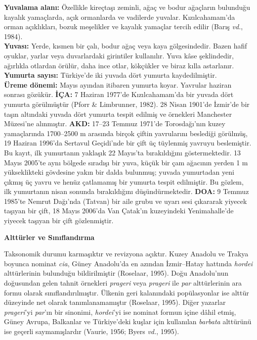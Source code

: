 \documentclass[
  10.5pt,
  a4paper,
  DIV=11,
  numbers=noendperiod,
  twocolumn]{scrreprt}
\begin{document}
\textbf{Yuvalama alanı:} Özellikle kireçtaşı zeminli, ağaç ve bodur
ağaçların bulunduğu kayalık yamaçlarda, açık ormanlarda ve vadilerde
yuvalar. Kızılcahamam'da orman açıklıkları, bozuk meşelikler ve kayalık
yamaçlar tercih edilir (Barış \emph{vd.}, 1984).\\
\textbf{Yuvası:} Yerde, kısmen bir çalı, bodur ağaç veya kaya
gölgesindedir. Bazen hafif oyuklar, yarlar veya duvarlardaki girintiler
kullanılır. Yuva kâse şeklindedir, ağırlıkla otlardan örülür, daha ince
otlar, kökçükler ve biraz kılla astarlanır.\\
\textbf{Yumurta sayısı:} Türkiye'de iki yuvada dört yumurta
kaydedilmiştir.\\
\textbf{Üreme dönemi:} Mayıs ayından itibaren yumurta koyar. Yavrular
haziran sonrası gözükür. \textbf{İÇA:} 7 Haziran 1977'de Kızılcahamam'da
bir yuvada dört yumurta görülmüştür (Pforr \& Limbrunner, 1982). 28
Nisan 1901'de İzmir'de bir taşın altındaki yuvada dört yumurta tespit
edilmiş ve örnekleri Manchester Müzesi'ne alınmıştır. \textbf{AKD:}
17--23 Temmuz 1971'de Torosdağı'nın kuzey yamaçlarında 1700--2500 m
arasında birçok çiftin yavrularını beslediği görülmüş, 19 Haziran
1996'da Sertavul Geçidi'nde bir çift üç tüylenmiş yavruyu beslemiştir.
Bu kayıt, ilk yumurtanın yaklaşık 22 Mayıs'ta bırakıldığını
göstermektedir. 13 Mayıs 2005'te aynı bölgede sıradışı bir yuva, küçük
bir çam ağacının yerden 1 m yükseklikteki gövdesine yakın bir dalda
bulunmuş; yuvada yumurtadan yeni çıkmış üç yavru ve henüz çatlamamış bir
yumurta tespit edilmiştir. Bu gözlem, ilk yumurtanın nisan sonunda
bırakıldığını düşündürmektedir. \textbf{DOA:} 9 Temmuz 1985'te Nemrut
Dağı'nda (Tatvan) bir aile grubu ve uyarı sesi çıkararak yiyecek taşıyan
bir çift, 18 Mayıs 2006'da Van Çatak'ın kuzeyindeki Yenimahalle'de
yiyecek taşıyan bir çift gözlenmiştir.

\textbf{Alttürler ve Sınıflandırma}

Taksonomik durumu karmaşıktır ve revizyona açıktır. Kuzey Anadolu ve
Trakya boyunca nominat \emph{cia}, Güney Anadolu'da en azından
İzmir--Hatay hattında \emph{hordei} alttürlerinin bulunduğu
bildirilmiştir (Roselaar, 1995). Doğu Anadolu'nun doğusundan gelen
tahnit örnekleri \emph{prageri} veya \emph{prageri} ile \emph{par}
alttürlerinin ara formu olarak sınıflandırılmıştır. Ülkenin geri
kalanındaki popülasyonlar ise alttür düzeyinde net olarak
tanımlanamamıştır (Roselaar, 1995). Diğer yazarlar \emph{prageri}'yi
\emph{par}'ın bir sinonimi, \emph{hordei}'yi ise nominat formun içine
dâhil etmiş, Güney Avrupa, Balkanlar ve Türkiye'deki kuşlar için
kullanılan \emph{barbata} alttürünü ise geçerli saymamışlardır (Vaurie,
1956; Byers \emph{vd.}, 1995).
\end{document}
